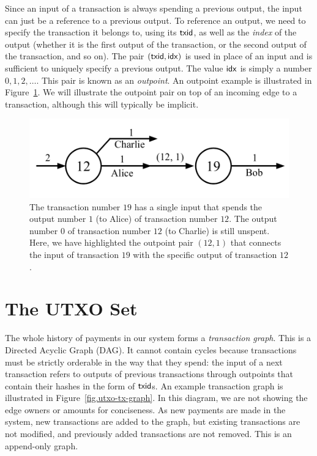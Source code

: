 Since an input of a transaction is always spending a previous output, the input can just be a
reference to a previous output. To reference an output, we need to specify the transaction it
belongs to, using its $\mathsf{txid}$, as well as the \emph{index} of the output (whether it is the first
output of the transaction, or the second output of the transaction, and so on). The pair
$(\mathsf{txid}, \mathsf{idx})$ is used in place of an input and is sufficient to uniquely specify a previous
output. The value $\mathsf{idx}$ is simply a number $0, 1, 2, \ldots$.
This pair is known as an \emph{outpoint}. An outpoint example is illustrated
in Figure~\ref{fig.utxo-outpoint}. We will illustrate the outpoint pair on top of an
incoming edge to a transaction, although this will typically be implicit.

\begin{figure}[h]
    \centering
    \includegraphics[width=0.65 \columnwidth,keepaspectratio]{figures/utxo-outpoint.pdf}
    \caption{The transaction number $19$ has a single input that spends the output number $1$ (to Alice)
             of transaction number $12$.
             The output number $0$ of transaction number $12$ (to Charlie) is still unspent.
             Here, we have highlighted the outpoint pair $(12, 1)$ that connects the input
             of transaction $19$ with the specific output of transaction $12$.}
    \label{fig.utxo-outpoint}
\end{figure}

\section{The UTXO Set}

The whole history of payments in our system forms a \emph{transaction graph}.
This is a Directed Acyclic Graph (DAG). It cannot contain cycles because transactions must be
strictly orderable in the way that they spend: the input of a next transaction refers to
outputs of previous transactions through outpoints that contain their hashes in the form of $\mathsf{txid}$s.
An example transaction graph is illustrated in Figure~\ref{fig.utxo-tx-graph}. In this diagram,
we are not showing the edge owners or amounts for conciseness. As new payments are made in the system,
new transactions are added to the graph, but existing transactions are not modified, and previously
added transactions are not removed. This is an append-only graph.

